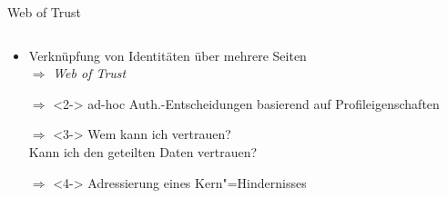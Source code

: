 \begin{frame}{Web of Trust \footnotesize\cite{sambraSolidPlatformDecentralized2016}}
    \begin{columns}
        \begin{column}{0.6\textwidth}
            \begin{itemize}
                \item Verknüpfung von Identitäten über mehrere Seiten\\
                    $\Rightarrow$ \emph{Web of Trust}
                
                \item[$\Rightarrow$]<2-> ad-hoc Auth.-Entscheidungen basierend auf Profileigenschaften
                
                \item[$\Rightarrow$]<3-> Wem kann ich vertrauen?\\ Kann ich den geteilten Daten vertrauen?
                
                \item[$\Rightarrow$]<4-> Adressierung eines Kern"=Hindernisses
            \end{itemize}

        \end{column}
        

\end{columns}
\end{frame}
